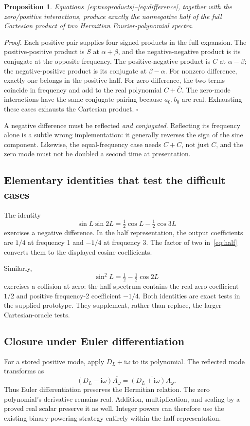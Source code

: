 \documentclass[11pt,letterpaper]{article}
\newcommand{\ii}{\mathrm i}
\newtheorem{proposition}{Proposition}
\newenvironment{proof}{\par\noindent\textit{Proof.}}{\hfill\(\square\)\par}
\begin{document}
\begin{proposition}
Equations~\eqref{eq:twoproducts}--\eqref{eq:difference}, together with the zero/positive interactions, produce exactly the nonnegative half of the full Cartesian product of two Hermitian Fourier-polynomial spectra.
\end{proposition}
\begin{proof}
Each positive pair supplies four signed products in the full expansion. The positive-positive product is \(S\) at \(\alpha+\beta\), and the negative-negative product is its conjugate at the opposite frequency. The positive-negative product is \(C\) at \(\alpha-\beta\); the negative-positive product is its conjugate at \(\beta-\alpha\). For nonzero difference, exactly one belongs in the positive half. For zero difference, the two terms coincide in frequency and add to the real polynomial \(C+\overline C\). The zero-mode interactions have the same conjugate pairing because \(a_0,b_0\) are real. Exhausting these cases exhausts the Cartesian product.
\end{proof}

A negative difference must be reflected \emph{and conjugated}. Reflecting its frequency alone is a subtle wrong implementation: it generally reverses the sign of the sine component. Likewise, the equal-frequency case needs \(C+\overline C\), not just \(C\), and the zero mode must not be doubled a second time at presentation.

\subsection{Elementary identities that test the difficult cases}
The identity
\[
 \sin L\sin 2L=\tfrac12\cos L-\tfrac12\cos3L
\]
exercises a negative difference. In the half representation, the output coefficients are \(1/4\) at frequency 1 and \(-1/4\) at frequency 3. The factor of two in~\eqref{eq:half} converts them to the displayed cosine coefficients.

Similarly,
\[
 \sin^2L=\tfrac12-\tfrac12\cos2L
\]
exercises a collision at zero: the half spectrum contains the real zero coefficient \(1/2\) and positive frequency-2 coefficient \(-1/4\). Both identities are exact tests in the supplied prototype. They supplement, rather than replace, the larger Cartesian-oracle tests.

\subsection{Closure under Euler differentiation}
For a stored positive mode, apply \(D_L+\ii\omega\) to its polynomial. The reflected mode transforms as
\[
 (D_L-\ii\omega)\overline{A_\omega}
   =\overline{(D_L+\ii\omega)A_\omega}.
\]
Thus Euler differentiation preserves the Hermitian relation. The zero polynomial's derivative remains real. Addition, multiplication, and scaling by a proved real scalar preserve it as well. Integer powers can therefore use the existing binary-powering strategy entirely within the half representation.
\end{document}
